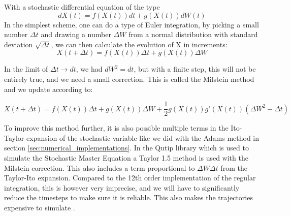 With a stochastic differential equation of the type 
\begin{equation}\label{eq:stochastic_diff_equation_numerical}
    dX(t) = f(X(t))dt + g(X(t)) dW(t) 
\end{equation}
In the simplest scheme, one can do a type of Euler integration, by picking a small number $\Delta t$ and drawing a number $\Delta W$ from a normal distribution with standard deviation $\sqrt{\Delta t}$, we can then calculate the evolution of X in increments:
\begin{equation}
    X(t + \Delta t) = f(X(t))\Delta t + g(X(t)) \Delta W
\end{equation}

In the limit of $\Delta t \to dt$, we had $dW^2 = dt$, but with a finite step, this will not be entirely true, and we need a small correction. This is called the Milstein method \cite{giles_numerical_nodate} and we update according to:
\begin{fullwidth}
\raggedleft
\begin{equation}
    X(t + \Delta t) = f(X(t))\Delta t + g(X(t)) \Delta W + \frac12 g(X(t))g'(X(t))\left(\Delta W^2 - \Delta t \right)
\end{equation}
\end{fullwidth}
To improve this method further, it is also possible multiple terms in the Ito-Taylor expansion of the stochastic variable like we did with the Adams method in section \ref{sec:numerical_implementations}. In the Qutip library which is used to simulate the Stochastic Master Equation a Taylor 1.5 method is used with the Milstein correction. This also includes a term proportional to $\Delta W \Delta t$ from the Taylor-Ito expansion. Compared to the 12th order implementation of the regular integration, this is however very imprecise, and we will have to significantly reduce the timesteps to make sure it is reliable. This also makes the trajectories expensive to simulate \cite{johansson_qutip_2012}.



